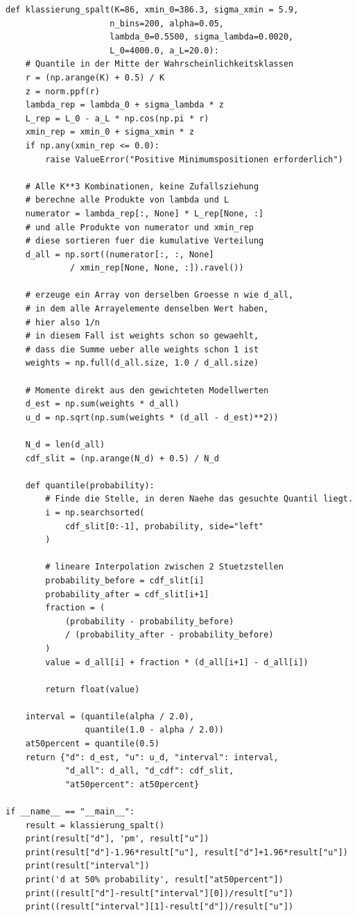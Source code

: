\begin{lstlisting}[style=Python]
def klassierung_spalt(K=86, xmin_0=386.3, sigma_xmin = 5.9, 
                     n_bins=200, alpha=0.05,
                     lambda_0=0.5500, sigma_lambda=0.0020,
                     L_0=4000.0, a_L=20.0):
    # Quantile in der Mitte der Wahrscheinlichkeitsklassen
    r = (np.arange(K) + 0.5) / K
    z = norm.ppf(r)
    lambda_rep = lambda_0 + sigma_lambda * z
    L_rep = L_0 - a_L * np.cos(np.pi * r)
    xmin_rep = xmin_0 + sigma_xmin * z
    if np.any(xmin_rep <= 0.0):
        raise ValueError("Positive Minimumspositionen erforderlich")

    # Alle K**3 Kombinationen, keine Zufallsziehung
    # berechne alle Produkte von lambda und L
    numerator = lambda_rep[:, None] * L_rep[None, :]
    # und alle Produkte von numerator und xmin_rep
    # diese sortieren fuer die kumulative Verteilung
    d_all = np.sort((numerator[:, :, None]
             / xmin_rep[None, None, :]).ravel())
    
    # erzeuge ein Array von derselben Groesse n wie d_all,
    # in dem alle Arrayelemente denselben Wert haben,
    # hier also 1/n
    # in diesem Fall ist weights schon so gewaehlt,
    # dass die Summe ueber alle weights schon 1 ist
    weights = np.full(d_all.size, 1.0 / d_all.size)

    # Momente direkt aus den gewichteten Modellwerten
    d_est = np.sum(weights * d_all)
    u_d = np.sqrt(np.sum(weights * (d_all - d_est)**2))

    N_d = len(d_all)
    cdf_slit = (np.arange(N_d) + 0.5) / N_d

    def quantile(probability):
        # Finde die Stelle, in deren Naehe das gesuchte Quantil liegt.
        i = np.searchsorted(
            cdf_slit[0:-1], probability, side="left"
        )

        # lineare Interpolation zwischen 2 Stuetzstellen
        probability_before = cdf_slit[i]
        probability_after = cdf_slit[i+1]
        fraction = (
            (probability - probability_before)
            / (probability_after - probability_before)
        )
        value = d_all[i] + fraction * (d_all[i+1] - d_all[i])

        return float(value)

    interval = (quantile(alpha / 2.0),
                quantile(1.0 - alpha / 2.0))
    at50percent = quantile(0.5)
    return {"d": d_est, "u": u_d, "interval": interval,
            "d_all": d_all, "d_cdf": cdf_slit,
            "at50percent": at50percent}

if __name__ == "__main__":
    result = klassierung_spalt()
    print(result["d"], 'pm', result["u"])
    print(result["d"]-1.96*result["u"], result["d"]+1.96*result["u"])
    print(result["interval"])
    print('d at 50% probability', result["at50percent"])
    print((result["d"]-result["interval"][0])/result["u"])
    print((result["interval"][1]-result["d"])/result["u"])
\end{lstlisting}


